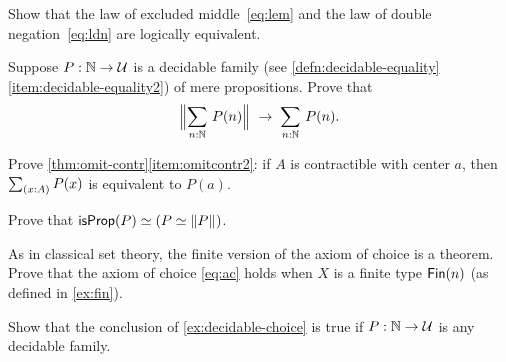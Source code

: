 \documentclass[hott-all.tex]{subfiles}
\begin{document}
\begin{ex}
  Show that the law of excluded middle~\eqref{eq:lem} and the law of double negation~\eqref{eq:ldn} are logically equivalent.
\end{ex}

\begin{ex}
  Suppose $P:\mathbb{N}\to\mathcal{U}$ is a decidable family (see \cref{defn:decidable-equality}\ref{item:decidable-equality2}) of mere propositions.
  Prove that
  \[ \Brck{\sm{n:\nat} P(n)} \;\to\; \sm{n:\nat}P(n).\]
\end{ex}

\begin{ex}
  Prove \cref{thm:omit-contr}\ref{item:omitcontr2}: if $A$ is contractible with center $a$, then $\sm{x:A} P(x)$ is equivalent to $P(a)$.
\end{ex}

\begin{ex}
  Prove that $\mathsf{isProp}(P) \simeq (P \simeq \mathopen{}\left\Vert P\right\Vert_{}\mathclose{})$.
\end{ex}

\begin{ex}
  As in classical set theory, the finite version of the axiom of choice is a theorem.  Prove that the axiom of choice \eqref{eq:ac} holds when $X$ is a finite type $\mathsf{Fin}(n)$ (as defined in \cref{ex:fin}).
\end{ex}

\begin{ex}
  Show that the conclusion of \cref{ex:decidable-choice} is true if $P:\mathbb{N}\to\mathcal{U}$ is any decidable family.
\end{ex}
\end{document}

